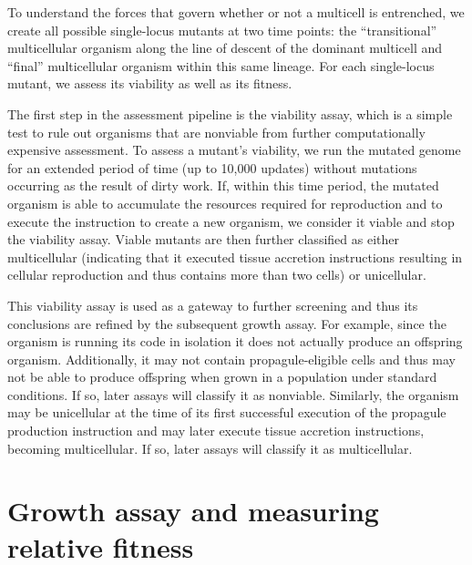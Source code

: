 \documentclass[
]{book}
\begin{document}
To understand the forces that govern whether or not a multicell is entrenched, we create all possible single-locus mutants at two time points: the ``transitional'' multicellular organism along the line of descent of the dominant multicell and ``final'' multicellular organism within this same lineage. For each single-locus mutant, we assess its viability as well as its fitness.

The first step in the assessment pipeline is the viability assay, which is a simple test to rule out organisms that are nonviable from further computationally expensive assessment. To assess a mutant's viability, we run the mutated genome for an extended period of time (up to 10,000 updates) without mutations occurring as the result of dirty work. If, within this time period, the mutated organism is able to accumulate the resources required for reproduction and to execute the instruction to create a new organism, we consider it viable and stop the viability assay. Viable mutants are then further classified as either multicellular (indicating that it executed tissue accretion instructions resulting in cellular reproduction and thus contains more than two cells) or unicellular.

This viability assay is used as a gateway to further screening and thus its conclusions are refined by the subsequent growth assay. For example, since the organism is running its code in isolation it does not actually produce an offspring organism. Additionally, it may not contain propagule-eligible cells and thus may not be able to produce offspring when grown in a population under standard conditions. If so, later assays will classify it as nonviable. Similarly, the organism may be unicellular at the time of its first successful execution of the propagule production instruction and may later execute tissue accretion instructions, becoming multicellular. If so, later assays will classify it as multicellular.

\hypertarget{growth-assay-and-measuring-relative-fitness}{%
\section{Growth assay and measuring relative fitness}\label{growth-assay-and-measuring-relative-fitness}}
\end{document}
